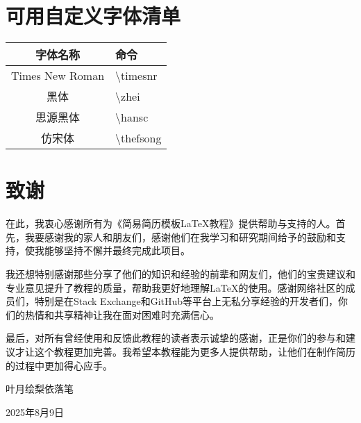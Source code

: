 \documentclass[a4paper,12pt]{ctexart}
\begin{document}
	\newpage
	\section{可用自定义字体清单}	
	\begin{table}[ht]
		\centering
		\renewcommand{\arraystretch}{1.2}
		\begin{tabularx}{\textwidth}{|c|>{\raggedright\arraybackslash}X|}
			\hline
			\textbf{字体名称}       & \textbf{命令}                        \\
			\hline
			Times New Roman        & \textbackslash timesnr \\
			\hline
			黑体                  & \textbackslash zhei\\
			\hline
			思源黑体              & \textbackslash hansc \\
			\hline
			仿宋体                & \textbackslash thefsong\\
			\hline
		\end{tabularx}
	\end{table}	
	
	\newpage
	\section{致谢}
	在此，我衷心感谢所有为《简易简历模板LaTeX教程》提供帮助与支持的人。首先，我要感谢我的家人和朋友们，感谢他们在我学习和研究期间给予的鼓励和支持，使我能够坚持不懈并最终完成此项目。
	
	我还想特别感谢那些分享了他们的知识和经验的前辈和网友们，他们的宝贵建议和专业意见提升了教程的质量，帮助我更好地理解LaTeX的使用。感谢网络社区的成员们，特别是在Stack Exchange和GitHub等平台上无私分享经验的开发者们，你们的热情和共享精神让我在面对困难时充满信心。
	
	最后，对所有曾经使用和反馈此教程的读者表示诚挚的感谢，正是你们的参与和建议才让这个教程更加完善。我希望本教程能为更多人提供帮助，让他们在制作简历的过程中更加得心应手。
	
	\begin{flushright}
		叶月绘梨依\quad 落笔
		
		2025年8月9日
	\end{flushright} 
\end{document}

